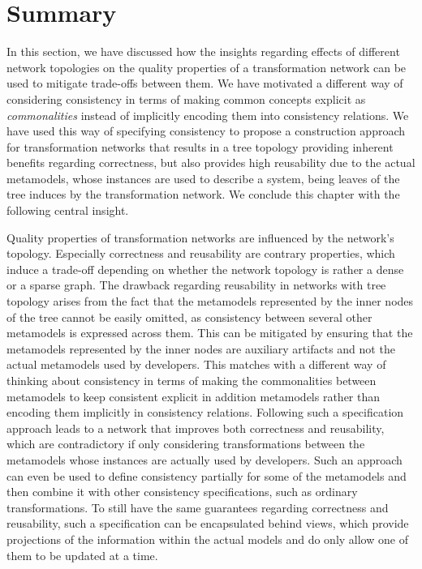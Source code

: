 \section{Summary}

In this section, we have discussed how the insights regarding effects of different network topologies on the quality properties of a transformation network can be used to mitigate trade-offs between them.
We have motivated a different way of considering consistency in terms of making common concepts explicit as \emph{commonalities} instead of implicitly encoding them into consistency relations.
We have used this way of specifying consistency to propose a construction approach for transformation networks that results in a tree topology providing inherent benefits regarding correctness, but also provides high reusability due to the actual metamodels, whose instances are used to describe a system, being leaves of the tree induces by the transformation network.
We conclude this chapter with the following central insight.

\begin{insight}
    Quality properties of transformation networks are influenced by the network's topology.
    Especially correctness and reusability are contrary properties, which induce a trade-off depending on whether the network topology is rather a dense or a sparse graph.
    The drawback regarding reusability in networks with tree topology arises from the fact that the metamodels represented by the inner nodes of the tree cannot be easily omitted, as consistency between several other metamodels is expressed across them.
    This can be mitigated by ensuring that the metamodels represented by the inner nodes are auxiliary artifacts and not the actual metamodels used by developers.
    This matches with a different way of thinking about consistency in terms of making the commonalities between metamodels to keep consistent explicit in addition metamodels rather than encoding them implicitly in consistency relations.
    Following such a specification approach leads to a network that improves both correctness and reusability, which are contradictory if only considering transformations between the metamodels whose instances are actually used by developers.
    Such an approach can even be used to define consistency partially for some of the metamodels and then combine it with other consistency specifications, such as ordinary transformations.
    To still have the same guarantees regarding correctness and reusability, such a specification can be encapsulated behind views, which provide projections of the information within the actual models and do only allow one of them to be updated at a time.
\end{insight}